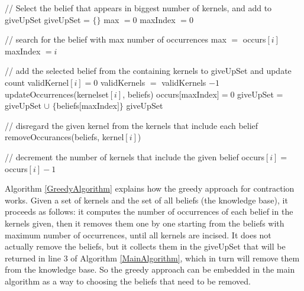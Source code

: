\begin{algorithm}
\begin{algorithmic}[1]
\State // Select the belief that appears in biggest number of kernels, and add to giveUpSet
\State giveUpSet = $\lbrace \rbrace$
\State max $= 0$
\State maxIndex $= 0$

\State // search for the belief with max number of occurrences
\State max $=$ occurs$[i]$
\State maxIndex $= i$
\EndIf
\EndFor

\State // add the selected belief from the containing kernels to giveUpSet and update count
\State validKernel$[i] = 0$
\State validKernels $=$ validKernels $- 1$
\State updateOccurrences(kernelset$[i]$, beliefs)
\EndIf
\EndFor
\State occurs$[$maxIndex$] = 0$
\State giveUpSet = giveUpSet $\cup$ $\lbrace$beliefs$[$maxIndex$] \rbrace$
\EndWhile
\State \Return giveUpSet
\EndFunction
\end{algorithmic}
\end{algorithm}

\begin{algorithm}
\begin{algorithmic}[1]
\State // disregard the given kernel from the kernels that include each belief
\State removeOccurances(beliefs, kernel$[i]$)
\EndFor
\EndFunction
\end{algorithmic}

\begin{algorithmic}[1]
\State // decrement the number of kernels that include the given belief
\State occurs$[i] =$ occurs$[i] - 1$
\EndIf
\EndFor
\EndFunction
\end{algorithmic}
\end{algorithm}

Algorithm \ref{GreedyAlgorithm} explains how the greedy approach for contraction works. Given a set of kernels and the set of all beliefs (the knowledge base), it proceeds as follows: it computes the number of occurrences of each belief in the kernels given, then it removes them one by one starting from the beliefs with maximum number of occurrences, until all kernels are incised. It does not actually remove the beliefs, but it collects them in the giveUpSet that will be returned in line 3 of Algorithm \ref{MainAlgorithm}, which in turn will remove them from the knowledge base. So the greedy approach can be embedded in the main algorithm as a way to choosing the beliefs that need to be removed. 
	
